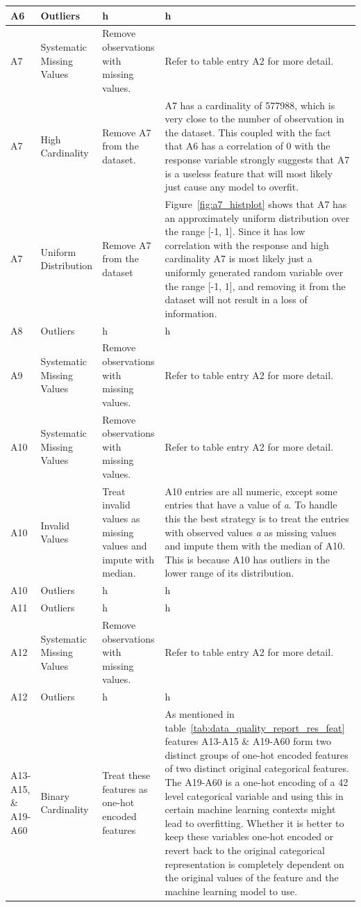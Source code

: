 \documentclass[11pt]{report}
\begin{document}
\begin{longtable}{lp{4cm}p{4cm}p{5cm}}
\midrule
A6 & Outliers & h & h \\
\midrule
A7 & Systematic Missing Values & Remove observations with missing values. & Refer to table entry A2 for more detail. \\
\midrule
A7 & High Cardinality & Remove A7 from the dataset. & A7 has a cardinality of 577988, which is very close to the number of observation in the dataset. This coupled with the fact that A6 has a correlation of 0 with the response variable strongly suggests that A7 is a useless feature that will most likely just cause any model to overfit. \\
\midrule
A7 & Uniform Distribution & Remove A7 from the dataset & Figure~\ref{fig:a7_histplot} shows that A7 has an approximately uniform distribution over the range [-1, 1]. Since it has low correlation with the response and high cardinality A7 is most likely just a uniformly generated random variable over the range [-1, 1], and removing it from the dataset will not result in a loss of information. \\
\midrule
A8 & Outliers & h & h \\
\midrule
A9 & Systematic Missing Values & Remove observations with missing values. & Refer to table entry A2 for more detail. \\
\midrule
A10 & Systematic Missing Values & Remove observations with missing values. & Refer to table entry A2 for more detail. \\
\midrule
A10 & Invalid Values & Treat invalid values as missing values and impute with median. & A10 entries are all numeric, except some entries that have a value of \textit{a}. To handle this the best strategy is to treat the entries with observed values \textit{a} as missing values and impute them with the median of A10. This is because A10 has outliers in the lower range of its distribution. \\
\midrule
A10 & Outliers & h & h \\
\midrule
A11 & Outliers & h & h \\
\midrule
A12 & Systematic Missing Values & Remove observations with missing values. & Refer to table entry A2 for more detail. \\
\midrule
A12 & Outliers & h & h \\
\midrule
A13-A15, \& A19-A60 & Binary Cardinality & Treat these features as one-hot encoded features & As mentioned in table~\ref{tab:data_quality_report_res_feat} features A13-A15 \& A19-A60 form two distinct groups of one-hot encoded features of two distinct original categorical features. The A19-A60 is a one-hot encoding of a 42 level categorical variable and using this in certain machine learning contexts might lead to overfitting. Whether it is better to keep these variables one-hot encoded or revert back to the original categorical representation is completely dependent on the original values of the feature and the machine learning model to use. \\

\end{longtable}
\end{document}
